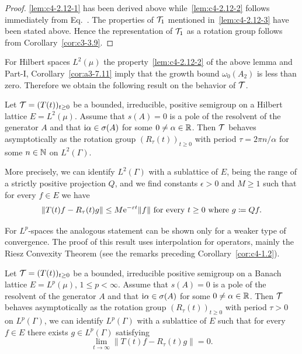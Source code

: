 \begin{proof}
\ref{lem:c4-2.12-1} has been derived above while~\ref{lem:c4-2.12-2} follows immediately from Eq.~.
The properties of\/ $\mathcal{T}_{1}$ mentioned in~\ref{lem:c4-2.12-3} have been stated above.
Hence the representation of\/ $\mathcal{T}_{1}$ as a rotation group follows from Corollary~\ref{cor:c3-3.9}.
\end{proof}
For Hilbert spaces $L^{2}(\mu)$ the property~\ref{lem:c4-2.12-2} of the above lemma and Part-I, Corollary~\ref{cor:a3-7.11} imply that the growth bound $\omega_{0}(A_{2})$ is less than zero.
Therefore we obtain the following result on the behavior of\/ $\mathcal{T}$.
\begin{proposition}\label{prop:c4-2.13}
Let $\TT = (T(t))_{t\geq 0}$ be a bounded, irreducible, positive semigroup on a Hilbert lattice $E = L^{2}(\mu)$.
Assume that $s(A) = 0$ is a pole of the resolvent of the generator $A$ and that $\mathrm{i}\alpha \in \sigma(A)$ for some $0 \neq \alpha \in \mathbb{R}$.
Then $\mathcal{T}$ behaves asymptotically as the rotation group $(R_{\tau}(t))_{t \geq 0}$ with period $\tau = 2\pi n/\alpha$ for some $n \in \mathbb{N}$ on $L^{2}(\Gamma)$.

More precisely, we can identify $L^{2}(\Gamma)$ with a sublattice of\/ $E$, being the range of a strictly positive projection $Q$, and we find constants $\epsilon > 0$ and $M \geq 1$ such that for every $f \in E$ we have
\begin{equation}\label{eq:c4-2.11}
\|T(t)f - R_{\tau}(t)g\| \leq M\eu^{-\epsilon t}\|f\| \text{ for every } t \geq 0 \text{ where } g \coloneq Qf.
\end{equation}
\end{proposition}
For $L^{p}$-spaces the analogous statement can be shown only for a weaker type of convergence.
The proof of this result uses interpolation for operators, mainly the Riesz Convexity Theorem (see the remarks preceding Corollary~\ref{cor:c4-1.2}).
\begin{theorem}\label{thm:c4-2.14}
%
%
%
Let $\TT = (T(t))_{t \geq 0}$ be a bounded, irreducible positive semigroup on a Banach lattice $E = L^{p}(\mu)$, $1 \leq p < \infty$.
Assume that $s(A) = 0$ is a pole of the resolvent of the generator $A$ and that $\mathrm{i}\alpha \in \sigma(A)$ for some $0 \neq \alpha \in \mathbb{R}$.
Then $\mathcal{T}$ behaves asymptotically as the rotation group $(R_{\tau}(t))_{t \geq 0}$ with period $\tau > 0$ on $L^{p}(\Gamma)$, \ie  we can identify $L^{p}(\Gamma)$ with a sublattice of\/ $E$ such that for every $f \in E$ there exists $g \in L^{p}(\Gamma)$ satisfying
\begin{equation}\label{eq:c4-2.12}
\lim_{t \to \infty} \|T(t)f - R_{\tau}(t)g\| = 0.
\end{equation}
\end{theorem}
